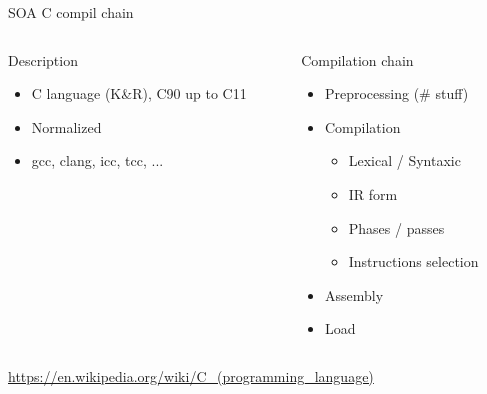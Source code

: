 %
\begin{Frame}{SOA C compil chain}
  \begin{columns}[t]
    \begin{column}{5cm} %
      \begin{block}{Description}
        \begin{itemize}
        \item C language (K\&R), C90 up to C11
        \item Normalized
        \item gcc, clang, icc, tcc, ...
        \end{itemize}
      \end{block}
    \end{column}

    \begin{column}{5cm} %
      \begin{block}{Compilation chain}
        \begin{itemize}
        \item Preprocessing (\# stuff)
        \item Compilation
          \begin{itemize}
          \item Lexical / Syntaxic
          \item IR form
          \item Phases / passes
          \item Instructions selection
          \end{itemize}
        \item Assembly
        \item Load
        \end{itemize}
      \end{block}
    \end{column}
  \end{columns}
  \url{https://en.wikipedia.org/wiki/C_(programming_language)}
\end{Frame}

